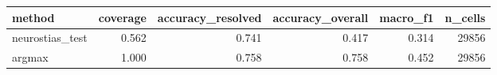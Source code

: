 \begin{tabular}{lrrrrr}
\toprule
method & coverage & accuracy_resolved & accuracy_overall & macro_f1 & n_cells \\
\midrule
neurostias_test & 0.562 & 0.741 & 0.417 & 0.314 & 29856 \\
argmax & 1.000 & 0.758 & 0.758 & 0.452 & 29856 \\
\bottomrule
\end{tabular}
